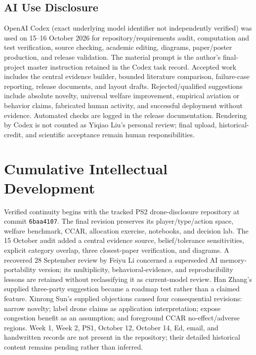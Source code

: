 \subsection{AI Use Disclosure}
OpenAI Codex (exact underlying model identifier not independently verified) was used on 15--16 October 2026 for repository/requirements audit, computation and test verification, source checking, academic editing, diagrams, paper/poster production, and release validation. The material prompt is the author's final-project master instruction retained in the Codex task record. Accepted work includes the central evidence builder, bounded literature comparison, failure-case reporting, release documents, and layout drafts. Rejected/qualified suggestions include absolute novelty, universal welfare improvement, empirical aviation or behavior claims, fabricated human activity, and successful deployment without evidence. Automated checks are logged in the release documentation. Rendering by Codex is not counted as Yiqiao Liu's personal review; final upload, historical-credit, and scientific acceptance remain human responsibilities.

\section{Cumulative Intellectual Development}
Verified continuity begins with the tracked PS2 drone-disclosure repository at commit \texttt{6baa4107}. The final revision preserves its player/type/action space, welfare benchmark, CCAR, allocation exercise, notebooks, and decision lab. The 15 October audit added a central evidence source, belief/tolerance sensitivities, explicit category overlap, three closest-paper verification, and diagrams. A recovered 28 September review by Feiyu Li concerned a superseded AI memory-portability version; its multiplicity, behavioral-evidence, and reproducibility lessons are retained without reclassifying it as current-model review. Han Zhang's supplied three-party suggestion became a roadmap test rather than a claimed feature. Xinrong Sun's supplied objections caused four consequential revisions: narrow novelty; label drone claims as application interpretation; expose congestion benefit as an assumption; and foreground CCAR no-effect/adverse regions. Week 1, Week 2, PS1, October 12, October 14, Ed, email, and handwritten records are not present in the repository; their detailed historical content remains pending rather than inferred.

